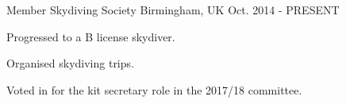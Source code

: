 

\begin{cventries}

  \cventry
    {Member} %
    {Skydiving Society} %
    {Birmingham, UK} %
    {Oct. 2014 - PRESENT} %
    {
      \begin{cvitems} %
        \item {Progressed to a B license skydiver.}
        \item {Organised skydiving trips.}
        \item {Voted in for the kit secretary role in the 2017/18 committee.}
      \end{cvitems}
    }

\end{cventries}
